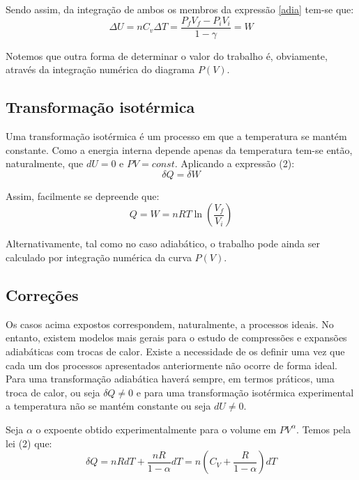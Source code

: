 \documentclass[9pt]{extarticle}
\begin{document}
\begin{multicols}{2}
\par Sendo assim, da integração de ambos os membros da expressão \eqref{adia} tem-se que: 
\begin{equation}
\Delta U = n C_v \Delta T = \frac{P_fV_f-P_iV_i}{1-\gamma} = W
\end{equation}
\par Notemos que outra forma de determinar o valor do trabalho é, obviamente, através da integração numérica do diagrama $P(V)$.

\subsection*{Transformação isotérmica}

\par Uma transformação isotérmica é um processo em que a temperatura se mantém constante. Como a energia interna depende apenas da temperatura tem-se então, naturalmente, que $d U = 0$ e $PV=const$. Aplicando a expressão (2):
\begin{equation}
\delta Q = \delta W 
\end{equation}
\par Assim, facilmente se depreende que:
\begin{equation}
Q = W = nRT \ln \left(\frac{V_f}{V_i} \right)
\end{equation}
\par Alternativamente, tal como no caso adiabático, o trabalho pode ainda ser calculado por integração numérica da curva $P(V)$.

\subsection*{Correções}

\par Os casos acima expostos correspondem, naturalmente, a processos ideais. No entanto, existem modelos mais gerais para o estudo de compressões e expansões adiabáticas com trocas de calor. Existe a necessidade de os definir uma vez que cada um dos processos apresentados anteriormente não ocorre de forma ideal. Para uma transformação adiabática haverá sempre, em termos práticos, uma troca de calor, ou seja $\delta Q \neq 0$ e para uma transformação isotérmica experimental a temperatura não se mantém constante ou seja $dU \neq 0$. 

\par Seja $\alpha$ o expoente obtido experimentalmente para o volume em $PV^{\alpha}$. Temos pela lei (2) que:
\begin{equation}
\delta Q = nRdT + \frac{nR}{1-\alpha}dT = n \left(C_V + \frac{R}{1-\alpha}\right) dT
\end{equation}


\end{multicols}
\end{document}
